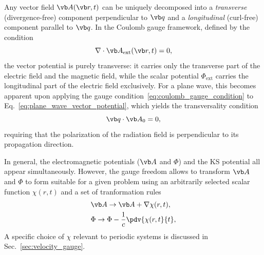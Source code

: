 Any vector field $\vb A(\vb r,t)$ can be uniquely decomposed into a \emph{transverse} (divergence-free) component perpendicular to $\vb q$ and a
\emph{longitudinal} (curl-free) component parallel to $\vb q$.
In the Coulomb gauge framework, defined by the condition
\begin{equation}
  \nabla \cdot \vb A_{\mathrm{ext}}(\vb r,t) = 0,
\label{eq:coulomb_gauge_condition}
\end{equation}
the vector potential is purely transverse: it carries only the transverse part of the electric field and the magnetic field,
while the scalar potential $\Phi_{\mathrm{ext}}$ carries the longitudinal part of the electric field exclusively.
For a plane wave, this becomes apparent upon applying the
gauge condition~\eqref{eq:coulomb_gauge_condition} to
Eq.~\eqref{eq:plane_wave_vector_potential}, which yields
the transversality condition
\begin{equation}
  \vb q \cdot \vb A_0 = 0,
  \label{eq:transversality_condition}
\end{equation}
requiring that the polarization of the radiation field is perpendicular to its propagation direction.



 In general,  the electromagnetic  potentials ($\vb A$ and $\Phi$)  and the KS potential all appear simultaneously. However, the gauge  freedom  allows  to transform  
 $\vb A$ and $\Phi$ to form suitable for a given problem using an arbitrarily selected scalar function $\chi(r,t)$  and  a set of  tranformation rules
\begin{align}
	& \vb A  \to \vb  A +\nabla\chi(r,t) , \\
	& \Phi \to \Phi-   \frac{1}{c}  \pdv{\chi(r,t}{t} ,
  \label{eq:gauge-rules}
\end{align}
A specific choice of $\chi$ relevant to periodic systems is discussed in Sec.~\ref{sec:velocity_gauge}.

